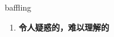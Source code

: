 
\begin{frame}
{\huge baffling}
\begin{center}
\begin{enumerate}\Large
  \item \textbf{令人疑惑的，难以理解的}
\end{enumerate}
\end{center}
\end{frame}
